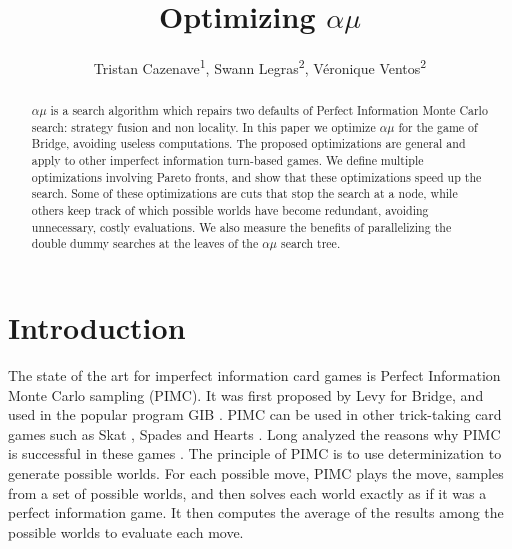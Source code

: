 \documentclass[letterpaper]{article} %
\begin{document}

\title{Optimizing $\alpha\mu$}

\author{Tristan Cazenave\textsuperscript{\rm 1},
        Swann Legras\textsuperscript{\rm 2},
        Véronique Ventos\textsuperscript{\rm 2}\\
}


\maketitle

\begin{abstract}
$\alpha\mu$ is a search algorithm which repairs two defaults of Perfect Information Monte Carlo search: strategy fusion and non locality. In this paper we optimize $\alpha\mu$ for the game of Bridge, avoiding useless computations. The proposed optimizations are general and apply to other  imperfect information turn-based games. We define multiple optimizations involving Pareto fronts, and show that these optimizations speed up the search. Some of these optimizations are cuts that stop the search at a node, while others keep track of which possible worlds have become redundant, avoiding unnecessary, costly evaluations. We also measure the benefits of parallelizing the double dummy searches at the leaves of the $\alpha\mu$ search tree.
\end{abstract}


\section{Introduction}

The state of the art for imperfect information card games is Perfect Information Monte Carlo sampling (PIMC). It was first proposed by Levy \cite{levy1989million} for Bridge, and used in the popular program GIB \cite{ginsberg2001}. PIMC can be used in other trick-taking card games such as Skat \cite{buro2009improving,kupferschmid2006skat}, Spades and Hearts \cite{sturtevant2006feature}. Long analyzed the reasons why PIMC is successful in these games \cite{long2010understanding}. The principle of PIMC is to use determinization to generate possible worlds. For each possible move,  PIMC plays the move, samples from a set of possible worlds, and then solves each world exactly as if it was a perfect information game. It then computes the average of the results among the possible worlds to evaluate each move.
\end{document}
